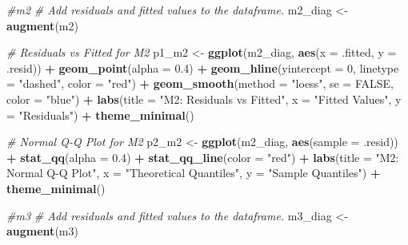 \documentclass[
]{article}
\newenvironment{Shaded}{\begin{snugshade}}{\end{snugshade}}
\newcommand{\AttributeTok}[1]{\textcolor[rgb]{0.13,0.29,0.53}{#1}}
\newcommand{\CommentTok}[1]{\textcolor[rgb]{0.56,0.35,0.01}{\textit{#1}}}
\newcommand{\ConstantTok}[1]{\textcolor[rgb]{0.56,0.35,0.01}{#1}}
\newcommand{\DecValTok}[1]{\textcolor[rgb]{0.00,0.00,0.81}{#1}}
\newcommand{\FloatTok}[1]{\textcolor[rgb]{0.00,0.00,0.81}{#1}}
\newcommand{\FunctionTok}[1]{\textcolor[rgb]{0.13,0.29,0.53}{\textbf{#1}}}
\newcommand{\NormalTok}[1]{#1}
\newcommand{\OtherTok}[1]{\textcolor[rgb]{0.56,0.35,0.01}{#1}}
\newcommand{\SpecialCharTok}[1]{\textcolor[rgb]{0.81,0.36,0.00}{\textbf{#1}}}
\newcommand{\StringTok}[1]{\textcolor[rgb]{0.31,0.60,0.02}{#1}}
\begin{document}
\begin{Shaded}
\begin{Highlighting}[]
\CommentTok{\#m2}
\CommentTok{\# Add residuals and fitted values to the dataframe.}
\NormalTok{m2\_diag }\OtherTok{\textless{}{-}} \FunctionTok{augment}\NormalTok{(m2)}

\CommentTok{\# Residuals vs Fitted for M2}
\NormalTok{p1\_m2 }\OtherTok{\textless{}{-}} \FunctionTok{ggplot}\NormalTok{(m2\_diag, }\FunctionTok{aes}\NormalTok{(}\AttributeTok{x =}\NormalTok{ .fitted, }\AttributeTok{y =}\NormalTok{ .resid)) }\SpecialCharTok{+}
  \FunctionTok{geom\_point}\NormalTok{(}\AttributeTok{alpha =} \FloatTok{0.4}\NormalTok{) }\SpecialCharTok{+}
  \FunctionTok{geom\_hline}\NormalTok{(}\AttributeTok{yintercept =} \DecValTok{0}\NormalTok{, }\AttributeTok{linetype =} \StringTok{"dashed"}\NormalTok{, }\AttributeTok{color =} \StringTok{"red"}\NormalTok{) }\SpecialCharTok{+}
  \FunctionTok{geom\_smooth}\NormalTok{(}\AttributeTok{method =} \StringTok{"loess"}\NormalTok{, }\AttributeTok{se =} \ConstantTok{FALSE}\NormalTok{, }\AttributeTok{color =} \StringTok{"blue"}\NormalTok{) }\SpecialCharTok{+}
  \FunctionTok{labs}\NormalTok{(}\AttributeTok{title =} \StringTok{"M2: Residuals vs Fitted"}\NormalTok{,}
       \AttributeTok{x =} \StringTok{"Fitted Values"}\NormalTok{,}
       \AttributeTok{y =} \StringTok{"Residuals"}\NormalTok{) }\SpecialCharTok{+}
  \FunctionTok{theme\_minimal}\NormalTok{()}

\CommentTok{\# Normal Q{-}Q Plot for M2}
\NormalTok{p2\_m2 }\OtherTok{\textless{}{-}} \FunctionTok{ggplot}\NormalTok{(m2\_diag, }\FunctionTok{aes}\NormalTok{(}\AttributeTok{sample =}\NormalTok{ .resid)) }\SpecialCharTok{+}
  \FunctionTok{stat\_qq}\NormalTok{(}\AttributeTok{alpha =} \FloatTok{0.4}\NormalTok{) }\SpecialCharTok{+}
  \FunctionTok{stat\_qq\_line}\NormalTok{(}\AttributeTok{color =} \StringTok{"red"}\NormalTok{) }\SpecialCharTok{+}
  \FunctionTok{labs}\NormalTok{(}\AttributeTok{title =} \StringTok{"M2: Normal Q{-}Q Plot"}\NormalTok{,}
       \AttributeTok{x =} \StringTok{"Theoretical Quantiles"}\NormalTok{,}
       \AttributeTok{y =} \StringTok{"Sample Quantiles"}\NormalTok{) }\SpecialCharTok{+}
  \FunctionTok{theme\_minimal}\NormalTok{()}

\CommentTok{\#m3}
\CommentTok{\# Add residuals and fitted values to the dataframe.}
\NormalTok{m3\_diag }\OtherTok{\textless{}{-}} \FunctionTok{augment}\NormalTok{(m3)}


\end{Highlighting}
\end{Shaded}
\end{document}
